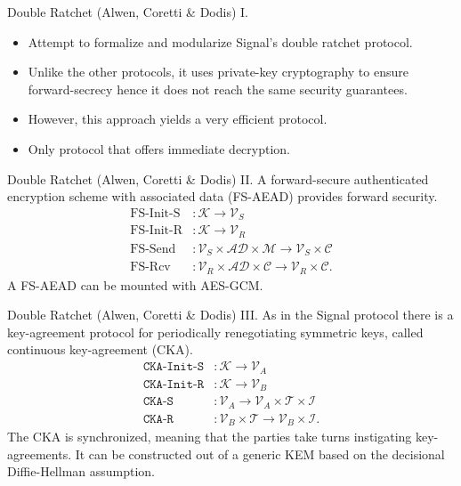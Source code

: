 \documentclass{beamer}
\renewcommand{\t}{\text}
\begin{document}
\begin{frame}{Double Ratchet (Alwen, Coretti \& Dodis) I.}
  \begin{itemize}
  \item Attempt to formalize and modularize Signal's double ratchet protocol.
  \item Unlike the other protocols, it uses private-key cryptography to ensure
    forward-secrecy hence it does not reach the same security guarantees.
  \item However, this approach yields a very efficient protocol.
  \item Only protocol that offers immediate decryption.
  \end{itemize}
\end{frame}

\begin{frame}{Double Ratchet (Alwen, Coretti \& Dodis) II.}
  A forward-secure authenticated encryption scheme with associated data (FS-AEAD)
  provides forward security.
  \begin{align*}
    \t{FS-Init-S} & : \mathcal{K} \rightarrow \mathcal{V}_S \\
    \t{FS-Init-R} & : \mathcal{K} \rightarrow \mathcal{V}_R \\
    \t{FS-Send} & : \mathcal{V}_S \times \mathcal{AD} \times \mathcal{M}
                                \rightarrow \mathcal{V}_S \times \mathcal{C} \\
    \t{FS-Rcv} & : \mathcal{V}_R \times \mathcal{AD} \times \mathcal{C}
                                \rightarrow \mathcal{V}_R \times \mathcal{C}.
  \end{align*}
  A FS-AEAD can be mounted with AES-GCM.
\end{frame}

\begin{frame}{Double Ratchet (Alwen, Coretti \& Dodis) III.}
  As in the Signal protocol there is a key-agreement protocol for periodically
  renegotiating symmetric keys, called continuous key-agreement (CKA).
  \begin{align*}
    \texttt{CKA-Init-S} & : \mathcal{K} \rightarrow \mathcal{V}_A \\
    \texttt{CKA-Init-R} & : \mathcal{K} \rightarrow \mathcal{V}_B \\
    \texttt{CKA-S} & : \mathcal{V}_A \rightarrow
                \mathcal{V}_A \times \mathcal{T} \times \mathcal{I} \\
    \texttt{CKA-R} & : \mathcal{V}_B \times \mathcal{T} \rightarrow
                \mathcal{V}_B \times \mathcal{I}.
  \end{align*}
  The CKA is synchronized, meaning that the parties take turns instigating
  key-agreements. It can be constructed out of a generic KEM based on
  the decisional Diffie-Hellman assumption.
\end{frame}
\end{document}
